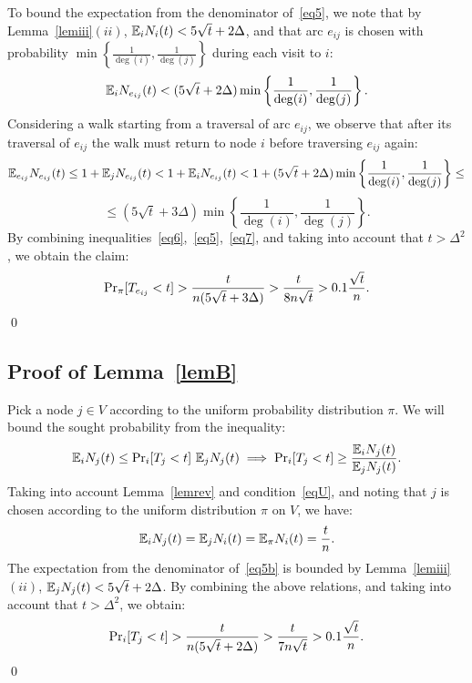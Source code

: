 \documentclass[11pt,a4paper]{article}
\newcommand{\E}{\ensuremath \mathbb E}
\renewcommand{\Pr}{\ensuremath \mathrm {Pr}}
\renewcommand{\*}{\hspace*{5mm}}
\begin{document}
To bound the expectation from the denominator of~\eqref{eq5}, we note that by Lemma~\ref{lemiii}$(ii)$,  $\E_i N_i (t)  < 5 \sqrt t + 2 \Delta$, and that arc $e_{ij}$ is chosen with probability $\min\left\{\frac{1}{\deg (i)}, \frac{1}{\deg(j)}\right\}$ during each visit to $i$:
$$
\E_i N_{e_{ij}} (t)  < (5 \sqrt t + 2\Delta) \min\left\{\frac{1}{\deg (i)}, \frac{1}{\deg(j)}\right\}.
$$
Considering a walk starting from a traversal of arc $e_{ij}$, we observe that after its traversal of  $e_{ij}$ the walk must return to node $i$ before traversing $e_{ij}$ again:
$$
\E_{e_{ij}} N_{e_{ij}} (t)  \leq  1 + \E_{j} N_{e_{ij}} (t) < 1 + \E_i N_{e_{ij}} (t) < 1 + (5 \sqrt t + 2 \Delta)  \min\left\{\frac{1}{\deg (i)}, \frac{1}{\deg(j)}\right\} \leq
$$
\begin{equation}\label{eq7}
\leq (5 \sqrt t + 3 \Delta) \min\left\{\frac{1}{\deg (i)}, \frac{1}{\deg(j)}\right\}.
\end{equation}
By combining inequalities~\eqref{eq6},~\eqref{eq5},~\eqref{eq7}, and taking into account that $t > \Delta^2$, we obtain the claim:
$$
\Pr_{\pi} [T_{ e_{ij}} < t] > \frac{t}{n (5\sqrt t + 3 \Delta)} > \frac{t}{8n \sqrt t} > 0.1 \frac{\sqrt{t}}{n}.
$$
\qed


\subsection*{Proof of Lemma~\ref{lemB}}

Pick a node $j \in V$ according to the uniform probability distribution $\pi$. We will bound the sought probability from the inequality:
\begin{equation}\label{eq5b}
\E_{i} N_{j} (t) \leq \Pr_{i} [T_{j} < t]\ \E_{j} N_{j} (t)
\implies
\Pr_{i} [T_{j} < t] \geq \frac{\E_{i} N_{j} (t)}{\E_{j} N_{j} (t)}.
\end{equation}
Taking into account Lemma~\ref{lemrev} and condition~\eqref{eqU}, and noting that $j$ is chosen according to the uniform distribution $\pi$ on $V$, we have:
\begin{equation}\label{eq6a}
\E_{i} N_{j} (t) = \E_{j} N_{i} (t) = \E_{\pi} N_{i} (t) = \frac{t}{n}.
\end{equation}
The expectation from the denominator of~\eqref{eq5b} is bounded by Lemma~\ref{lemiii}$(ii)$, $\E_{j} N_{j} (t) < 5\sqrt t + 2\Delta$. By combining the above relations, and taking into account that $t > \Delta^2$, we obtain:
$$
\Pr_{i} [T_{j} < t] > \frac{t}{n (	5\sqrt t + 2 \Delta)} > \frac{t}{7n \sqrt t} > 0.1 \frac{\sqrt{t}}{n}.
$$
\qed
\end{document}
